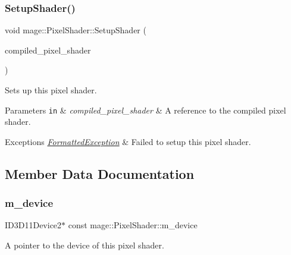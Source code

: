 \subsubsection{\texorpdfstring{Setup\+Shader()}{SetupShader()}}
{\footnotesize\ttfamily void mage\+::\+Pixel\+Shader\+::\+Setup\+Shader (\begin{DoxyParamCaption}\item[{const \hyperlink{structmage_1_1_compiled_pixel_shader}{Compiled\+Pixel\+Shader} \&}]{compiled\+\_\+pixel\+\_\+shader }\end{DoxyParamCaption})\hspace{0.3cm}{\ttfamily [private]}}

Sets up this pixel shader.


\begin{DoxyParams}[1]{Parameters}
\mbox{\tt in}  & {\em compiled\+\_\+pixel\+\_\+shader} & A reference to the compiled pixel shader. \\
\hline
\end{DoxyParams}

\begin{DoxyExceptions}{Exceptions}
{\em \hyperlink{structmage_1_1_formatted_exception}{Formatted\+Exception}} & Failed to setup this pixel shader. \\
\hline
\end{DoxyExceptions}


\subsection{Member Data Documentation}
\hypertarget{classmage_1_1_pixel_shader_a7fa34f27d8f39db2403edac28ddecc68}{}\label{classmage_1_1_pixel_shader_a7fa34f27d8f39db2403edac28ddecc68} 
\subsubsection{\texorpdfstring{m\+\_\+device}{m\_device}}
{\footnotesize\ttfamily I\+D3\+D11\+Device2$\ast$ const mage\+::\+Pixel\+Shader\+::m\+\_\+device\hspace{0.3cm}{\ttfamily [protected]}}

A pointer to the device of this pixel shader. \hypertarget{classmage_1_1_pixel_shader_a6b9bbf18f255b061fb75453f32a78720}{}\label{classmage_1_1_pixel_shader_a6b9bbf18f255b061fb75453f32a78720} 
